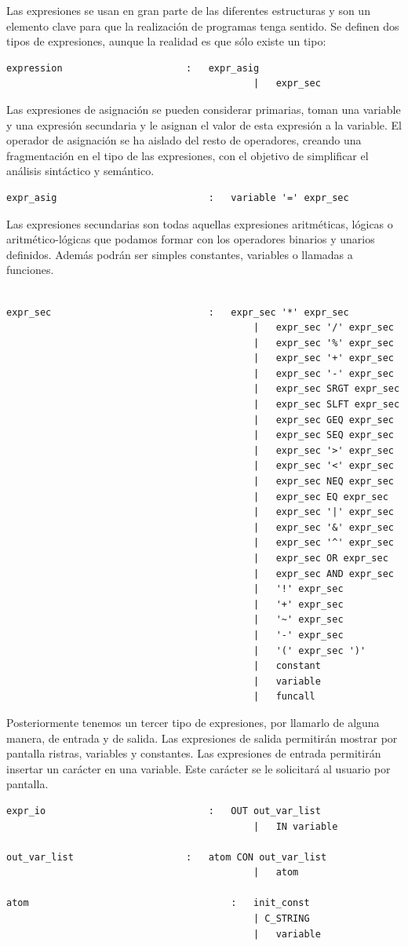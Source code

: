 \documentclass[a4paper,10pt]{article}
\begin{document}
Las expresiones se usan en gran parte de las diferentes estructuras y son un elemento clave para que la realización de programas tenga sentido. Se definen dos tipos de expresiones, aunque la realidad es que sólo existe un tipo:

\begin{lstlisting}
expression						:	expr_asig
											|	expr_sec 
\end{lstlisting}

Las expresiones de asignación se pueden considerar primarias, toman una variable y una expresión secundaria y le asignan el valor de esta expresión a la variable. El operador de asignación se ha aislado del resto de operadores, creando una fragmentación en el tipo de las expresiones, con el objetivo de simplificar el análisis sintáctico y semántico.
\begin{lstlisting}
expr_asig							:	variable '=' expr_sec 
\end{lstlisting}

Las expresiones secundarias son todas aquellas expresiones aritméticas, lógicas o aritmético-lógicas que podamos formar con los operadores binarios y unarios definidos. Además podrán ser simples constantes, variables o llamadas a funciones.
\begin{lstlisting}
											
expr_sec							:	expr_sec '*' expr_sec 
											|	expr_sec '/' expr_sec 
											|	expr_sec '%' expr_sec 
											|	expr_sec '+' expr_sec 
											|	expr_sec '-' expr_sec 
											|	expr_sec SRGT expr_sec
											|	expr_sec SLFT expr_sec
											|	expr_sec GEQ expr_sec 
											|	expr_sec SEQ expr_sec 
											|	expr_sec '>' expr_sec 
											|	expr_sec '<' expr_sec 
											|	expr_sec NEQ expr_sec 
											|	expr_sec EQ expr_sec 
											|	expr_sec '|' expr_sec 
											|	expr_sec '&' expr_sec 
											|	expr_sec '^' expr_sec 
											|	expr_sec OR expr_sec  
											|	expr_sec AND expr_sec 
											|	'!' expr_sec 
											|	'+' expr_sec 
											|	'~' expr_sec 
											|	'-' expr_sec 
											|	'(' expr_sec ')' 
											|	constant 
											|	variable 
											|	funcall 
\end{lstlisting}

Posteriormente tenemos un tercer tipo de expresiones, por llamarlo de alguna manera, de entrada y de salida. Las expresiones de salida permitirán mostrar por pantalla ristras, variables y constantes. Las expresiones de entrada permitirán insertar un carácter en una variable. Este carácter se le solicitará al usuario por pantalla.
\begin{lstlisting}
expr_io								:	OUT out_var_list
											|	IN variable
											
out_var_list					:	atom CON out_var_list
											|	atom
											
atom 									:	init_const
											| C_STRING 
											|	variable
											
\end{lstlisting}
\end{document}
